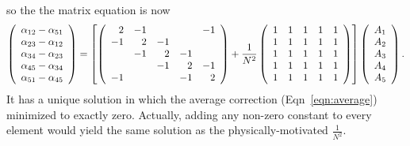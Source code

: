 \documentclass[12pt]{article}
\begin{document}
so the the matrix equation is now
\begin{equation}
\left(\begin{array}{c}
\alpha_{12} - \alpha_{51} \\
\alpha_{23} - \alpha_{12} \\
\alpha_{34} - \alpha_{23} \\
\alpha_{45} - \alpha_{34} \\
\alpha_{51} - \alpha_{45}
\end{array} \right)
=
\left[\left(\begin{array}{r r r r r}
2 & -1 &  &  & -1 \\
-1 & 2 & -1 &  &  \\
 & -1 & 2 & -1 &  \\
 &  & -1 & 2 & -1 \\
-1 &  &  & -1 & 2
\end{array}\right)
+
\frac{1}{N^2}
\left(\begin{array}{r r r r r}
1 & 1 & 1 & 1 & 1 \\
1 & 1 & 1 & 1 & 1 \\
1 & 1 & 1 & 1 & 1 \\
1 & 1 & 1 & 1 & 1 \\
1 & 1 & 1 & 1 & 1
\end{array}\right)
\right]
\left(\begin{array}{c}
A_1 \\
A_2 \\
A_3 \\
A_4 \\
A_5 \\
\end{array} \right)\mbox{.}
\label{eqn:solution}
\end{equation}
It has a unique solution in which the average correction
(Eqn~\ref{eqn:average}) minimized to exactly zero.  Actually, adding
any non-zero constant to every element would yield the same solution as
the physically-motivated $\frac{1}{N^2}$.
\end{document}
